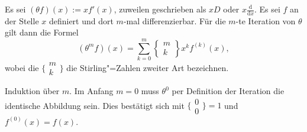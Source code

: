 \begin{Satz}
Es sei $(\theta f)(x) := xf'(x)$, zuweilen geschrieben als $xD$ oder
$x\tfrac{\mathrm d}{\mathrm dx}$. Es sei $f$ an der Stelle $x$ definiert
und dort $m$-mal differenzierbar. Für die $m$-te Iteration von $\theta$
gilt dann die Formel%
\[(\theta^m f)(x) = \sum_{k=0}^m\begin{Bmatrix}m\\ k\end{Bmatrix}x^k f^{(k)}(x),\]
wobei die $\big\{\!\begin{smallmatrix}m\\ k\end{smallmatrix}\!\big\}$ die
Stirling"=Zahlen zweiter Art bezeichnen.
\end{Satz}
\begin{Beweis} Induktion über $m$. Im Anfang $m=0$ muss
$\theta^0$ per Definition der Iteration die identische Abbildung
sein. Dies bestätigt sich mit
$\big\{\!\begin{smallmatrix}0\\ 0\end{smallmatrix}\!\big\}=1$
und $f^{(0)}(x)=f(x)$.


\end{Beweis}
